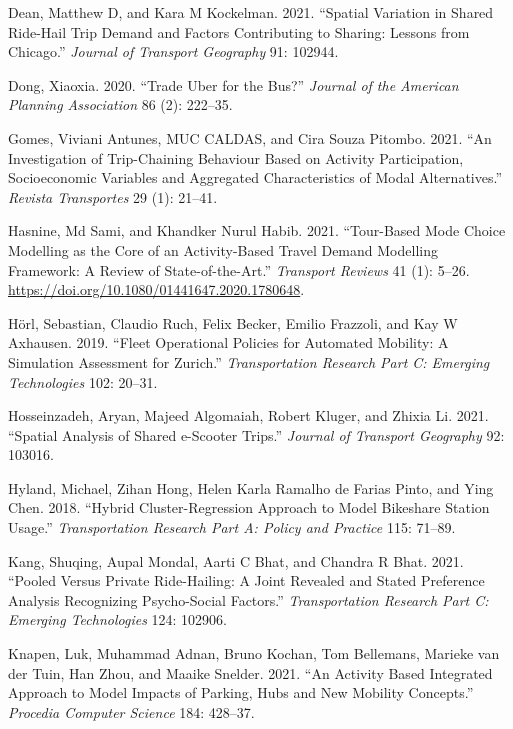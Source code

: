 \documentclass[12pt, oneside, openright]{byuthesis}
\newlength{\cslhangindent}
\newlength{\cslentryspacingunit} %
\newenvironment{CSLReferences}[2] %
 {%
  \setlength{\parindent}{0pt}
  \ifodd #1
  \let\oldpar\par
  \def\par{\hangindent=\cslhangindent\oldpar}
  \fi
  \setlength{\parskip}{#2\cslentryspacingunit}
 }%
 {}
\begin{document}
\begin{CSLReferences}{1}{0}
\leavevmode{}%
Dean, Matthew D, and Kara M Kockelman. 2021. {``Spatial Variation in Shared Ride-Hail Trip Demand and Factors Contributing to Sharing: Lessons from Chicago.''} \emph{Journal of Transport Geography} 91: 102944.

\leavevmode{}%
Dong, Xiaoxia. 2020. {``Trade Uber for the Bus?''} \emph{Journal of the American Planning Association} 86 (2): 222--35.

\leavevmode{}%
Gomes, Viviani Antunes, MUC CALDAS, and Cira Souza Pitombo. 2021. {``An Investigation of Trip-Chaining Behaviour Based on Activity Participation, Socioeconomic Variables and Aggregated Characteristics of Modal Alternatives.''} \emph{Revista Transportes} 29 (1): 21--41.

\leavevmode{}%
Hasnine, Md Sami, and Khandker Nurul Habib. 2021. {``Tour-Based Mode Choice Modelling as the Core of an Activity-Based Travel Demand Modelling Framework: A Review of State-of-the-Art.''} \emph{Transport Reviews} 41 (1): 5--26. \url{https://doi.org/10.1080/01441647.2020.1780648}.

\leavevmode{}%
Hörl, Sebastian, Claudio Ruch, Felix Becker, Emilio Frazzoli, and Kay W Axhausen. 2019. {``Fleet Operational Policies for Automated Mobility: A Simulation Assessment for Zurich.''} \emph{Transportation Research Part C: Emerging Technologies} 102: 20--31.

\leavevmode{}%
Hosseinzadeh, Aryan, Majeed Algomaiah, Robert Kluger, and Zhixia Li. 2021. {``Spatial Analysis of Shared e-Scooter Trips.''} \emph{Journal of Transport Geography} 92: 103016.

\leavevmode{}%
Hyland, Michael, Zihan Hong, Helen Karla Ramalho de Farias Pinto, and Ying Chen. 2018. {``Hybrid Cluster-Regression Approach to Model Bikeshare Station Usage.''} \emph{Transportation Research Part A: Policy and Practice} 115: 71--89.

\leavevmode{}%
Kang, Shuqing, Aupal Mondal, Aarti C Bhat, and Chandra R Bhat. 2021. {``Pooled Versus Private Ride-Hailing: A Joint Revealed and Stated Preference Analysis Recognizing Psycho-Social Factors.''} \emph{Transportation Research Part C: Emerging Technologies} 124: 102906.

\leavevmode{}%
Knapen, Luk, Muhammad Adnan, Bruno Kochan, Tom Bellemans, Marieke van der Tuin, Han Zhou, and Maaike Snelder. 2021. {``An Activity Based Integrated Approach to Model Impacts of Parking, Hubs and New Mobility Concepts.''} \emph{Procedia Computer Science} 184: 428--37.


\end{CSLReferences}
\end{document}
